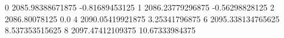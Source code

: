 0 2085.98388671875 -0.81689453125
1 2086.23779296875 -0.56298828125
2 2086.80078125 0.0
4 2090.05419921875 3.25341796875
6 2095.338134765625 8.537353515625
8 2097.47412109375 10.67333984375
